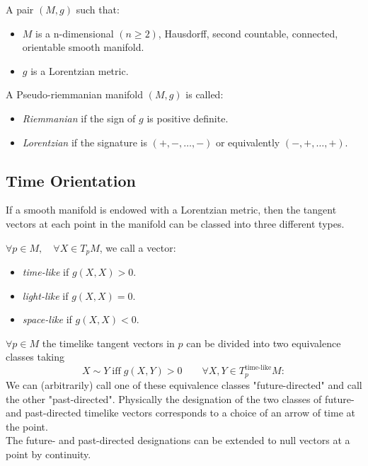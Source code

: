 \documentclass[Main]{subfiles}
\begin{document}
			\begin{definition}
				A pair $(M, g)$ such that:
				\begin{itemize}
					\item $M$ is a n-dimensional $(n\geq2)$, Hausdorff, second countable, connected, orientable smooth manifold.
					\item $g$ is a Lorentzian metric.
				\end{itemize}
			\end{definition}
			
			\begin{notationfix}
				A Pseudo-riemmanian manifold $(M,g)$ is called:
				 \begin{itemize}
				 	\item \emph{Riemmanian} if the sign of $g$ is positive definite.%
				 	\item \emph{Lorentzian} if the signature is $(+, -, \ldots,- )$ or equivalently $(-,+,\ldots,+)$.
				 \end{itemize}
			\end{notationfix}
		
		\subsection{Time Orientation}
			If a smooth manifold is endowed with a Lorentzian metric, then the tangent vectors at each point in the manifold can be classed into three different types. 
			\begin{notationfix}
				$\forall p \in M, \quad \forall X \in T_pM$,  we call a vector:
				\begin{itemize}
					\item \emph{time-like} if $g(X,X)>0$.
					\item \emph{light-like} if $g(X,X)=0$.
					\item \emph{space-like} if $g(X,X)<0$.
				\end{itemize}
			\end{notationfix}
		
			\begin{observation}
				$\forall p\in M$ the timelike tangent vectors in $p$ can be divided into two equivalence classes taking
				\begin{displaymath}
					X \sim Y \; \textrm{iff} \; g(X,Y)>0 \qquad \forall X,Y \in T^\textrm{time-like}_pM:
				\end{displaymath}
				We can (arbitrarily) call one of these equivalence classes "future-directed" and call the other "past-directed". Physically the designation of the two classes of future- and past-directed timelike vectors corresponds to a choice of an arrow of time at the point.
				\\
				The future- and past-directed designations can be extended to null vectors at a point by continuity.
			\end{observation}
	
\end{document}
